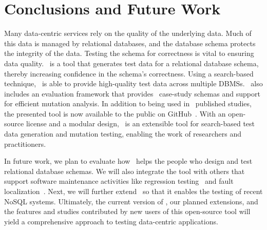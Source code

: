 \section{Conclusions and Future Work}\label{sec:conclusion}

Many data-centric services rely on the quality of the underlying data. Much of this data is managed by relational
databases, and the database schema protects the integrity of the data.  Testing the schema for correctness is vital to
ensuring data quality. \sa~is a tool that generates test data for a relational database schema, thereby increasing
confidence in the schema's correctness. Using a search-based technique, \sa~is able to provide high-quality test data
across multiple DBMSs. \sa~also includes an evaluation framework that provides \numprovidedschemas~case-study schemas
and support for efficient mutation analysis. In addition to being used in \numuniquepapers~published studies, the
presented tool is now available to the public on GitHub~\cite{tool}. With an open-source license and a modular design,
\sa~is an extensible tool for search-based test data generation and mutation testing, enabling the work of researchers
and practitioners.

In future work, we plan to evaluate how \sa~helps the people who design and test relational database schemas. We will
also integrate the tool with others that support software maintenance activities like regression
testing~\cite{Kapfhammer2008} and fault localization~\cite{Clark2011}. Next, we will further extend \sa~so that it
enables the testing of recent NoSQL systems. Ultimately, the current version of \sa, our planned extensions, and the
features and studies contributed by new users of this open-source tool will yield a comprehensive approach to testing
data-centric applications.
